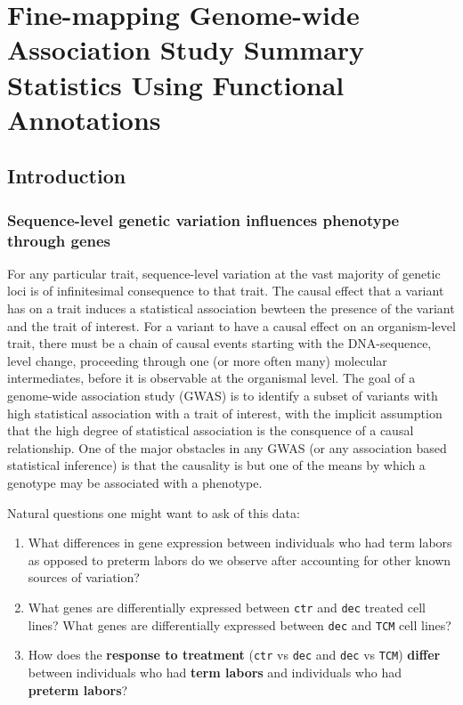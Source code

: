 \chapter{Fine-mapping Genome-wide Association Study Summary Statistics Using Functional Annotations}

\section{Introduction}\label{sec:org59556ac}

\subsection{Sequence-level genetic variation influences phenotype through genes}\label{sec:org1481578}

For any particular trait, sequence-level variation at the vast majority of genetic loci is of infinitesimal consequence to that trait.  The causal
effect that a variant has on a trait induces a statistical association bewteen the presence of the variant and the trait of interest.
For a variant to have a causal effect on an organism-level trait, there must be a chain of causal events starting with the DNA-sequence,
level change, proceeding through one (or more often many) molecular intermediates, before it is observable at the organismal level.
The goal of a genome-wide association study (GWAS) is to identify a subset of variants with high statistical association with a trait of interest,
with the implicit assumption that the high degree of statistical association is the consquence of a causal relationship.
One of the major obstacles in any GWAS (or any association based statistical inference) is that the causality is but one of the means by which
a genotype may be associated with a phenotype.  




Natural questions one might want to ask of this data:

\begin{enumerate}
\item What differences in gene expression between individuals who had term labors as opposed to preterm labors do we observe after accounting for other known sources of variation?
\item What genes are differentially expressed between \texttt{ctr} and \texttt{dec} treated cell lines? What genes are differentially expressed between \texttt{dec} and \texttt{TCM} cell lines?
\item How does the \textbf{response to treatment} (\texttt{ctr} vs \texttt{dec} and \texttt{dec} vs \texttt{TCM}) \textbf{differ} between individuals who had \textbf{term labors} and individuals who had \textbf{preterm labors}?
\end{enumerate}

